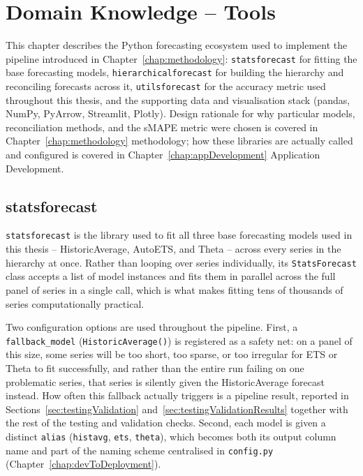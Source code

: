 %
%
%

\chapter{Domain Knowledge -- Tools}
\label{chap:domainKnowledgeTools}

This chapter describes the Python forecasting ecosystem used to implement the pipeline introduced in Chapter~\ref{chap:methodology}: \texttt{statsforecast} for fitting the base forecasting models, \texttt{hierarchicalforecast} for building the hierarchy and reconciling forecasts across it, \texttt{utilsforecast} for the accuracy metric used throughout this thesis, and the supporting data and visualisation stack (pandas, NumPy, PyArrow, Streamlit, Plotly). Design rationale for why particular models, reconciliation methods, and the sMAPE metric were chosen is covered in Chapter~\ref{chap:methodology} methodology; how these libraries are actually called and configured is covered in Chapter~\ref{chap:appDevelopment} Application Development.

\section{statsforecast}
\label{sec:statsforecastTool}

\texttt{statsforecast} \cite{Garza:2022} is the library used to fit all three base forecasting models used in this thesis -- HistoricAverage, AutoETS, and Theta -- across every series in the hierarchy at once. Rather than looping over series individually, its \texttt{StatsForecast} class accepts a list of model instances and fits them in parallel across the full panel of series in a single call, which is what makes fitting tens of thousands of series computationally practical.

Two configuration options are used throughout the pipeline. First, a \texttt{fallback\_model} (\texttt{HistoricAverage()}) is registered as a safety net: on a panel of this size, some series will be too short, too sparse, or too irregular for ETS or Theta to fit successfully, and rather than the entire run failing on one problematic series, that series is silently given the HistoricAverage forecast instead. How often this fallback actually triggers is a pipeline result, reported in Sections~\ref{sec:testingValidation} and~\ref{sec:testingValidationResults} together with the rest of the testing and validation checks. Second, each model is given a distinct \texttt{alias} (\texttt{histavg}, \texttt{ets}, \texttt{theta}), which becomes both its output column name and part of the naming scheme centralised in \texttt{config.py} (Chapter~\ref{chap:devToDeployment}).

